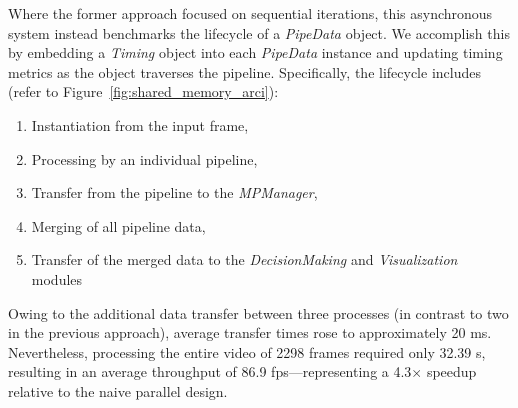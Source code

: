 \documentclass[conference]{IEEEtran}
\begin{document}
Where the former approach focused on sequential iterations, this asynchronous system instead benchmarks the lifecycle of a \textit{PipeData} object.
We accomplish this by embedding a \textit{Timing} object into each \textit{PipeData} instance and updating timing metrics as the object traverses the pipeline.
Specifically, the lifecycle includes (refer to Figure~\ref{fig:shared_memory_arci}):

\begin{enumerate}
\item Instantiation from the input frame,
\item Processing by an individual pipeline,
\item Transfer from the pipeline to the \textit{MPManager},
\item Merging of all pipeline data,
\item Transfer of the merged data to the \textit{DecisionMaking} and \textit{Visualization} modules
\end{enumerate}

Owing to the additional data transfer between three processes (in contrast to two in the previous approach), average transfer times rose to approximately 20 ms.
Nevertheless, processing the entire video of 2298 frames required only 32.39 s, resulting in an average throughput of 86.9 fps—representing a 4.3$\times$ speedup relative to the naive parallel design.

%
\end{document}
